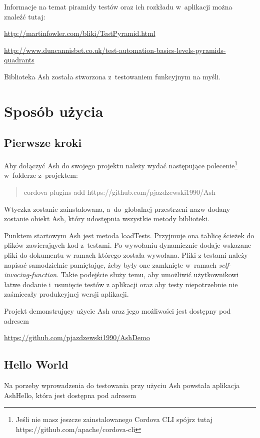\documentclass[brudnopis]{xmgr}
\begin{document}
Informacje na temat piramidy testów oraz ich rozkładu w~aplikacji można znaleźć tutaj:

\url{http://martinfowler.com/bliki/TestPyramid.html}

\url{http://www.duncannisbet.co.uk/test-automation-basics-levels-pyramids-quadrants}

Biblioteka Ash została stworzona z~testowaniem funkcyjnym na myśli.

\chapter{Sposób użycia}
\section{Pierwsze kroki}

Aby dołączyć Ash do swojego projektu należy wydać następujące polecenie\footnote{Jeśli nie masz jeszcze zainstalowanego Cordova CLI spójrz tutaj https://github.com/apache/cordova-cli} w~folderze z~projektem:
\begin{quote}
   cordova plugins add https://github.com/pjazdzewski1990/Ash
\end{quote}

Wtyczka zostanie zainstalowana, a~do~globalnej przestrzeni nazw dodany zostanie obiekt Ash, który udostępnia wszystkie metody biblioteki.

Punktem startowym Ash jest metoda loadTests. Przyjmuje ona tablicę ścieżek do plików zawierająych kod z~testami. Po wywołaniu dynamicznie dodaje wskazane pliki do dokumentu w ramach którego została wywołana. Pliki z testami należy napisać samodzielnie pamiętając, żeby były one zamknięte w~ramach \textit{self-invocing-function}. Takie podejście służy temu, aby umożliwić użytkownikowi łatwe dodanie i~usunięcie testów z aplikacji oraz aby testy niepotrzebnie nie zaśmiecały produkcyjnej wersji aplikacji.

Projekt demonstrujący użycie Ash oraz jego możliwości jest dostępny pod adresem

\url{https://github.com/pjazdzewski1990/AshDemo}

\section{Hello World}

Na porzeby wprowadzenia do testowania przy użyciu Ash powstała aplikacja AshHello, która jest dostępna pod adresem 
\end{document}

